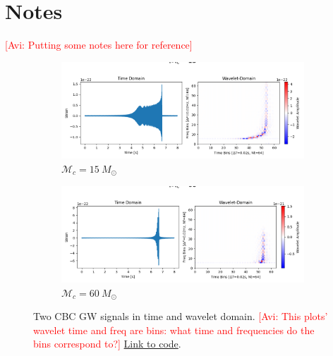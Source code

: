 \documentclass{article}
\newcommand{\avi}[1]{\textcolor{red}{[Avi: #1]}}
\begin{document}
\appendix

\section{Notes}

\avi{Putting some notes here for reference}

\begin{figure}
  \centering

  \begin{subfigure}{0.5\textwidth}
    \centering
    \includegraphics[width=\linewidth]{figures/cbc_imrphenom_d/cbc_wavelet_mc_15.png}
    \caption{$\mathcal{M}_c=15\ M_{\odot}$}
  \end{subfigure}

  \begin{subfigure}{0.5\textwidth}
    \centering
    \includegraphics[width=\linewidth]{figures/cbc_imrphenom_d/cbc_wavelet_mc_60.png}
    \caption{$\mathcal{M}_c=60\ M_{\odot}$}
  \end{subfigure}

  \caption{Two CBC GW signals in time and wavelet domain. \avi{This plots' wavelet time and freq are bins: what time and frequencies do the bins correspond to?} \href{https://github.com/avivajpeyi/pywavelet/blob/main/docs/demos/cbc_demo.ipynb}{Link to code}.}
\end{figure}
\end{document}
